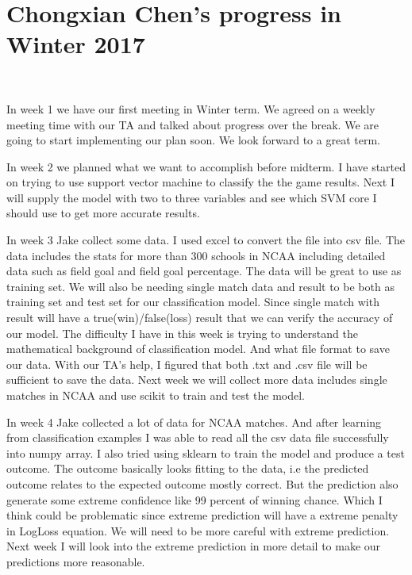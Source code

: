 \documentclass[letterpaper, 10pt,titlepage]{article}
\begin{document}
\section{Chongxian Chen's progress in Winter 2017}
\

\par In week 1 we have our first meeting in Winter term. We agreed on a weekly meeting time with our TA and talked about progress over the break. We are going to start implementing our plan soon. We look forward to a great term.

\par In week 2 we planned what we want to accomplish before midterm. I have started on trying to use support vector machine to classify the the game results. Next I will supply the model with two to three variables and see which SVM core I should use to get more accurate results.

\par In week 3 Jake collect some data. I used excel to convert the file into csv file. The data includes the stats for more than 300 schools in NCAA including detailed data such as field goal and field goal percentage. The data will be great to use as training set. We will also be needing single match data and result to be both as training set and test set for our classification model. Since single match with result will have a true(win)/false(loss) result that we can verify the accuracy of our model.
The difficulty I have in this week is trying to understand the mathematical background of classification model. And what file format to save our data. With our TA's help, I figured that both .txt and .csv file will be sufficient to save the data.
Next week we will collect more data includes single matches in NCAA and use scikit to train and test the model.

\par In week 4 Jake collected a lot of data for NCAA matches. And after learning from classification examples I was able to read all the csv data file successfully into numpy array. I also tried using sklearn to train the model and produce a test outcome. The outcome basically looks fitting to the data, i.e the predicted outcome relates to the expected outcome mostly correct. But the prediction also generate some extreme confidence like 99 percent of winning chance. Which I think could be problematic since extreme prediction will have a extreme penalty in LogLoss equation. We will need to be more careful with extreme prediction. Next week I will look into the extreme prediction in more detail to make our predictions more reasonable.
\end{document}
